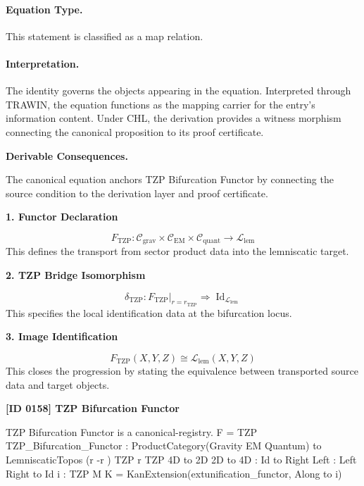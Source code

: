 \paragraph{Equation Type.}
This statement is classified as a map relation.

\paragraph{Interpretation.}
The identity governs the objects appearing in the equation. Interpreted through TRAWIN, the equation functions as the mapping carrier for the entry’s information content. Under CHL, the derivation provides a witness morphism connecting the canonical proposition to its proof certificate.

\par\vspace{0.35em}
\noindent\textbf{Derivable Consequences.}\quad
\begingroup
\footnotesize
\raggedright
The canonical equation anchors TZP Bifurcation Functor by connecting the source condition to the derivation layer and proof certificate.
\par\endgroup

\noindent\textbf{1. Functor Declaration}\par
\[
F_{\mathrm{TZP}}
:
\mathcal{C}_{\mathrm{grav}}\times
\mathcal{C}_{\mathrm{EM}}\times
\mathcal{C}_{\mathrm{quant}}
\longrightarrow
\mathcal{L}_{\mathrm{lem}}
\]
\noindent This defines the transport from sector product data into the lemniscatic target.\par
\noindent\textbf{2. TZP Bridge Isomorphism}\par
\[
\delta_{\mathrm{TZP}}
:
F_{\mathrm{TZP}}\big\vert_{r=r_{\mathrm{TZP}}}
\Rightarrow
\operatorname{Id}_{\mathcal{L}_{\mathrm{lem}}}
\]
\noindent This specifies the local identification data at the bifurcation locus.\par
\noindent\textbf{3. Image Identification}\par
\[
F_{\mathrm{TZP}}(X,Y,Z)\cong \mathcal{L}_{\mathrm{lem}}(X,Y,Z)
\]
\noindent This closes the progression by stating the equivalence between transported source data and target objects.\par

\clearpage
\noindent\textbf{[ID 0158] TZP Bifurcation Functor}\par
\vspace{0.35em}
\begingroup\small
{}
TZP Bifurcation Functor is a canonical-registry. F = TZP TZP\_Bifurcation\_Functor : ProductCategory(Gravity   EM   Quantum) to LemniscaticTopos  (r -r ) TZP r TZP 4D to 2D 2D to 4D   : Id to Right  Left   : Left  Right to Id i : TZP  M K = KanExtension(extunification\_functor, Along to i)

